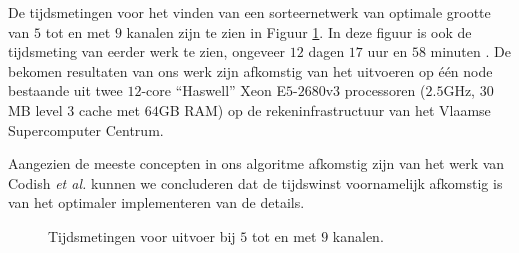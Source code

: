 \documentclass{article}
\begin{document}
De tijdsmetingen voor het vinden van een sorteernetwerk van optimale grootte van $5$ tot en met $9$ kanalen zijn te zien in Figuur \ref{Tijdsresultaten}.
In deze figuur is ook de tijdsmeting van eerder werk te zien, ongeveer $12$ dagen $17$ uur en $58$ minuten \cite{sortingNetworksSize2014}.
De bekomen resultaten van ons werk zijn afkomstig van het uitvoeren op \'e\'en node bestaande uit twee $12$-core ``Haswell'' Xeon E$5$-$2680$v$3$ processoren ($2.5$GHz, $30$MB level $3$ cache met $64$GB RAM) op de rekeninfrastructuur van het Vlaamse Supercomputer Centrum.

Aangezien de meeste concepten in ons algoritme afkomstig zijn van het werk van Codish \textit{et al.} kunnen we concluderen dat de tijdswinst voornamelijk afkomstig is van het optimaler implementeren van de details.
\begin{figure}[!h]
\centering
{}
\caption{Tijdsmetingen voor uitvoer bij $5$ tot en met $9$ kanalen.}
\label{Tijdsresultaten}
\end{figure}
\end{document}
